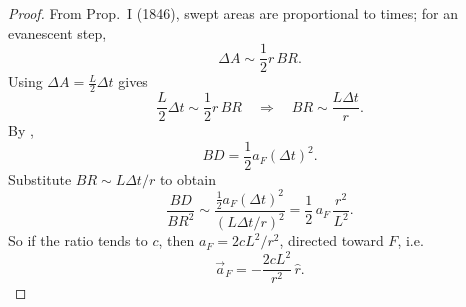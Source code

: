 \begin{proof}
From Prop.~I (1846), swept areas are proportional to times; for an evanescent step,
\[
  \Delta A\sim \frac12 r\,BR.
\]
Using $\Delta A=\frac{L}{2}\Delta t$ gives
\[
  \frac{L}{2}\Delta t\sim \frac12 r\,BR
  \quad\Longrightarrow\quad
  BR\sim \frac{L\Delta t}{r}.
\]
By ,
\[
  BD=\frac12 a_F(\Delta t)^2.
\]
Substitute $BR\sim L\Delta t/r$ to obtain
\[
  \frac{BD}{BR^2}
  \sim
  \frac{\frac12 a_F(\Delta t)^2}{(L\Delta t/r)^2}
  =
  \frac12\,a_F\,\frac{r^2}{L^2}.
\]
So if the ratio tends to $c$, then $a_F=2cL^2/r^2$, directed toward $F$, i.e.
\[
  \vec{a}_F=-\frac{2cL^2}{r^2}\,\hat{r}.
\]
\end{proof}
